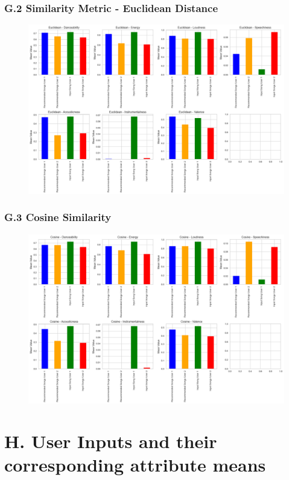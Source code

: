 \documentclass{article}
\begin{document}
\subsubsection*{G.2 Similarity Metric - Euclidean Distance}
\label{app:Euclidean}
\begin{figure}[H]
    \centering
    \includegraphics[width=0.9\linewidth]{Images/Euclidean_mean_values.png}
\end{figure}
\subsubsection*{G.3 Cosine Similarity}
\label{app:CosineSim}
\begin{figure}[H]
    \centering
    \includegraphics[width=0.9\linewidth]{Images/Cosine_mean_values.png}
\end{figure}

\section*{H. User Inputs and their corresponding attribute means}
\label{app:RecSysOP}
\end{document}
